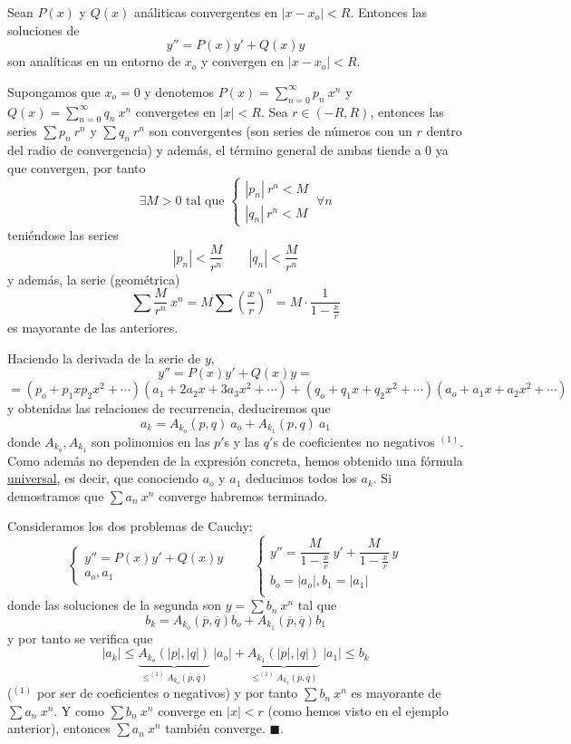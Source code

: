 \begin{teo}
 Sean $P(x)$ y $Q(x)$ análiticas convergentes en $|x-x_o|<R$. Entonces las soluciones de $$y''=P(x)y'+Q(x)y$$
 son analíticas en un entorno de $x_o$ y convergen en $|x-x_o|<R$.
\end{teo}
\begin{dem}
    Supongamos que $x_o=0$ y denotemos $\displaystyle P(x)=\sum_{n=0}^{\infty} p_n \: x^n$ y $\displaystyle Q(x)=\sum_{n=0}^{\infty} q_n \: x^n$ convergetes en $|x|<R$. Sea $r \in (-R,R)$, entonces las series $\sum p_n \: r^n $ y $\sum q_n \: r^n$ son convergentes (son series de números con un $r$ dentro del radio de convergencia) y además, el término general de ambas tiende a 0 ya que convergen, por tanto
    $$\exists M>0 \text{ tal que } \begin{cases}
        |p_n| \: r^n <M \\ |q_n| \: r^n <M
    \end{cases} \: \forall n$$
    teniéndose las series
    $$|p_n| < \dfrac{M}{r^n} \qquad   |q_n| < \dfrac{M}{r^n} $$
    y además, la serie (geométrica) $$\sum \dfrac{M}{r^n} \: x^n = M \sum \left( \dfrac{x}{r}\right)^n=M \cdot \dfrac{1}{1-\frac{x}{r}}$$ es mayorante de las anteriores.

    Haciendo la derivada de la serie de $y$,
    $$y''=P(x)y'+Q(x)y=$$
    $$=(p_o+p_1xp_2x^2+\cdots)(a_1+2a_2x+3a_3x^2+\cdots)+(q_o+q_1x+q_2x^2+\cdots )(a_o+a_1x+a_2x^2+\cdots )$$
    y obtenidas las relaciones de recurrencia, deduciremos que 
    $$a_k=A_{k_o}(p,q) \: a_o + A_{k_1}(p,q) \: a_1$$
    donde $A_{k_o}, A_{k_1}$ son polinomios en las $p'$s y las $q'$s de coeficientes no negativos $^{(1)}$. Como además no dependen de la expresión concreta, hemos obtenido una fórmula \underline{universal}, es decir, que conociendo $a_o$ y $a_1$ deducimos todos los $a_k$. Si demostramos que $\sum a_n \: x^n $ converge habremos terminado.

    Consideramos los dos problemas de Cauchy:
    $$\left\{ \begin{array}{l}
         y''=P(x)y'+Q(x)y \\
        a_o,a_1         
    \end{array}\right. \qquad \left\{ \begin{array}{l}
         y''=\dfrac{M}{1-\frac{x}{r}}\: y'+ \dfrac{M}{1-\frac{x}{r}} \: y  \\
          b_o=|a_o|, b_1=|a_1| \\
    \end{array}\right.$$
    donde las soluciones de la segunda son $y= \sum b_n \: x^n$ tal que 
    $$b_k=A_{k_o}(\overline{p}, \overline{q})b_o+A_{k_1}(\overline{p}, \overline{q})b_1$$
    y por tanto se verifica que 
    $$|a_k| \leq \underbrace{A_{k_o}(|p|,|q|)}_{\leq^{(1)} A_{k_o}(\overline{p}, \overline{q})} \: |a_o| + \underbrace{A_{k_1}(|p|,|q|)}_{\leq^{(1)} A_{k_1}(\overline{p}, \overline{q})}\: |a_1| \leq b_k$$
    ($^{(1)}$ por ser de coeficientes o negativos) y por tanto $\sum b_n \: x^n$ es mayorante de $\sum a_n \: x^n$. Y como $\sum b_n \: x^n$ converge en $|x|<r$ (como hemos visto en el ejemplo anterior), entonces $\sum a_n \: x^n$ también converge. \hfill $\blacksquare$.
\end{dem}
